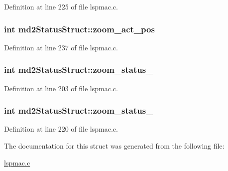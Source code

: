 Definition at line 225 of file lspmac.c.\hypertarget{structmd2StatusStruct_a920b80e9f5f08aedac3ad541d5ffc8ae}{
\subsubsection[{zoom\_\-act\_\-pos}]{\setlength{\rightskip}{0pt plus 5cm}int {\bf md2StatusStruct::zoom\_\-act\_\-pos}}}
\label{structmd2StatusStruct_a920b80e9f5f08aedac3ad541d5ffc8ae}


Definition at line 237 of file lspmac.c.\hypertarget{structmd2StatusStruct_af28e978b761dc07eefed3971547cfd4d}{
\subsubsection[{zoom\_\-status\_\-1}]{\setlength{\rightskip}{0pt plus 5cm}int {\bf md2StatusStruct::zoom\_\-status\_}}}
\label{structmd2StatusStruct_af28e978b761dc07eefed3971547cfd4d}


Definition at line 203 of file lspmac.c.\hypertarget{structmd2StatusStruct_a34e4200315a083deb8a970e21bbbe277}{
\subsubsection[{zoom\_\-status\_\-2}]{\setlength{\rightskip}{0pt plus 5cm}int {\bf md2StatusStruct::zoom\_\-status\_}}}
\label{structmd2StatusStruct_a34e4200315a083deb8a970e21bbbe277}


Definition at line 220 of file lspmac.c.

The documentation for this struct was generated from the following file:\begin{DoxyCompactItemize}
\item 
\hyperlink{lspmac_8c}{lspmac.c}\end{DoxyCompactItemize}

